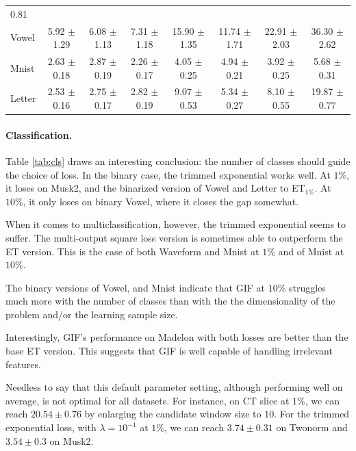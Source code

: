 \documentclass{article}
\newcommand{\bestA}{\cellcolor{orange}}
\newcommand{\bestB}{\cellcolor{dodgerblue}}
\begin{document}
\begin{table}[t]
\begin{center}
\begin{footnotesize}
\begin{sc}
\begin{tabular}{l|c|ccc|ccc}
0.81 \\
Vowel & 5.92 $\pm$ 1.29 & \bestA 6.08 $\pm$ 1.13 & 7.31 $\pm$ 1.18 & 15.90 
$\pm$ 1.35 & \bestB 11.74 $\pm$ 1.71 & 22.91 $\pm$ 2.03 & 36.30 $\pm$ 2.62 \\
Mnist & 2.63 $\pm$ 0.18 & 2.87 $\pm$ 0.19 & \bestA 2.26 $\pm$ 0.17 & 4.05 $\pm$ 
0.25 & 4.94 $\pm$ 0.21 & \bestB 3.92 $\pm$ 0.25 & 5.68 $\pm$ 0.31 \\
Letter & 2.53 $\pm$ 0.16 & \bestA 2.75 $\pm$ 0.17 & 2.82 $\pm$ 0.19 & 9.07 
$\pm$ 0.53 & \bestB 5.34 $\pm$ 0.27 & 8.10 $\pm$ 0.55 & 19.87 $\pm$ 0.77 \\
\hline
\end{tabular}
\end{sc}
\end{footnotesize}
\end{center}
\vskip -0.2in
\end{table}


\paragraph{Classification.}
Table \ref{tab:cls} draws an interesting conclusion: the number of classes 
should guide the choice of loss. In the binary case, the trimmed exponential 
works well. At $1\%$, it loses on Musk2, and the binarized version of 
Vowel and Letter to ET$_{1\%}$. At $10\%$, it only loses on binary Vowel, where 
it closes the gap somewhat.

When it comes to multiclassification, however, the trimmed exponential seems to 
suffer. The multi-output square loss version is sometimes able to outperform 
the ET version. This is the case of both Waveform and Mnist at $1\%$ and of 
Mnist at $10\%$. 

The binary versions of Vowel, and Mnist indicate that GIF at $10\%$ 
struggles much more with the number of classes than with the the dimensionality 
of the problem and/or the learning sample size. 

Interestingly, GIF's performance on Madelon with both losses are better than 
the base ET version. This suggests that GIF is well capable of handling 
irrelevant features.

Needless to say that this default parameter setting, although performing well 
on average, is not optimal for all datasets. For instance, on CT slice at 
$1\%$, we can reach $20.54 \pm 0.76$ by enlarging the candidate window size 
to $10$. 
For the trimmed exponential loss, with $\lambda = 10^{-1}$ at $1\%$, we can 
reach $3.74 \pm 0.31$ on Twonorm and $3.54 \pm 0.3$ on Musk2.
\end{document}
